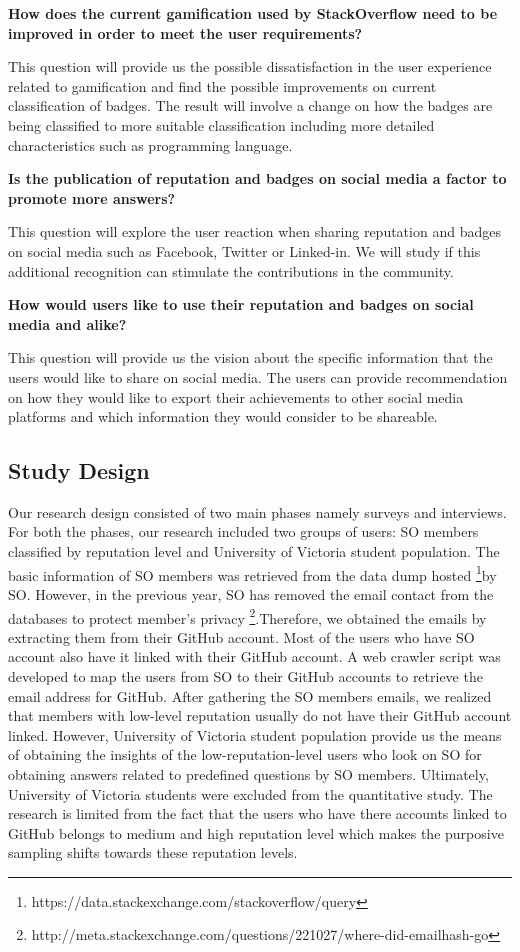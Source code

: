 \documentclass{sigchi}
\begin{document}
\textbf{How does the current gamification used by StackOverflow need to be improved in order to meet the user requirements?}

This question will provide us the possible dissatisfaction in the user experience related to gamification and find the possible improvements on current classification of badges. The result will involve a change on how the badges are being classified to more suitable classification including more detailed characteristics such as programming language.

\textbf{Is the publication of reputation and badges on social media a
factor to promote more answers?}

This question will explore the user reaction when sharing reputation and badges on social media such as Facebook, Twitter or Linked-in. We will study if this additional recognition can stimulate the contributions in the community.

\textbf{How would users like to use their reputation and badges
on social media and alike?}

This question will provide us the vision about the specific information that the users would like to share on social media. The users can provide recommendation on how they would like to export their achievements to other social media platforms and which information they would consider to be shareable.

\subsection{Study Design}
Our research design consisted of two main phases namely surveys and interviews. For both the phases, our research included two groups of users: SO members classified by reputation level and University of Victoria student population. The basic information of SO members was retrieved from the data dump hosted \footnote{https://data.stackexchange.com/stackoverflow/query}by SO. However, in the previous year, SO has removed the email contact from the databases to protect member's privacy \footnote{http://meta.stackexchange.com/questions/221027/where-did-emailhash-go}.Therefore, we obtained the emails by extracting them from their GitHub account. Most of the users who have SO account also have it linked with their GitHub account. A web crawler script was developed to map the users from SO to their GitHub accounts to retrieve the email address for GitHub. After gathering the SO members emails, we realized that members with low-level reputation usually do not have their GitHub account linked. However, University of Victoria student population provide us the means of obtaining the insights of the low-reputation-level users who look on SO for obtaining answers related to predefined questions by SO members. Ultimately, University of Victoria students were excluded from the quantitative study. The research is limited from the fact that the users who have there accounts linked to GitHub belongs to medium and high reputation level which makes the purposive sampling shifts towards these reputation levels.
\end{document}
